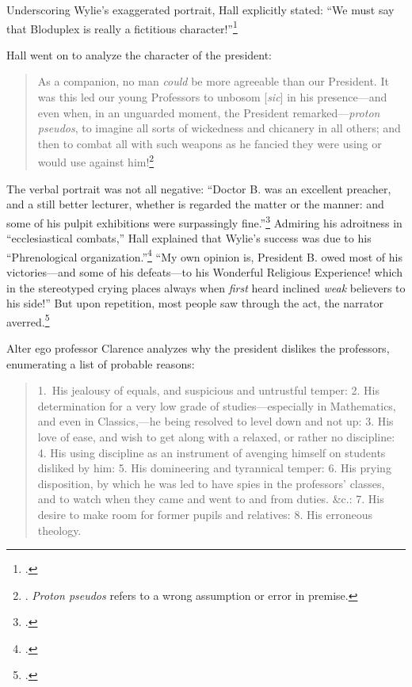 \documentclass[
  american,
  letterpaper,
]{scrreprt}
\begin{document}
Underscoring Wylie's exaggerated portrait, Hall explicitly stated: ``We
must say that Bloduplex is really a fictitious character!''\footnote{.}

Hall went on to analyze the character of the president:

\begin{quote}
As a companion, no man \emph{could} be more agreeable than our
President. It was this led our young Professors to unbosom
{[}\emph{sic}{]} in his presence---and even when, in an unguarded
moment, the President remarked---\emph{proton pseudos}, to imagine all
sorts of wickedness and chicanery in all others; and then to combat all
with such weapons as he fancied they were using or would use against
him!\footnote{. \emph{Proton
  pseudos} refers to a wrong assumption or error in premise.}
\end{quote}

The verbal portrait was not all negative: ``Doctor B. was an excellent
preacher, and a still better lecturer, whether is regarded the matter or
the manner: and some of his pulpit exhibitions were surpassingly
fine.''\footnote{.} Admiring his
adroitness in ``ecclesiastical combats,'' Hall explained that Wylie's
success was due to his ``Phrenological organization.''\footnote{.} ``My own opinion is, President B. owed most of his
victories---and some of his defeats---to his Wonderful Religious
Experience! which in the stereotyped crying places always when
\emph{first} heard inclined \emph{weak} believers to his side!'' But
upon repetition, most people saw through the act, the narrator
averred.\footnote{.}

Alter ego professor Clarence analyzes why the president dislikes the
professors, enumerating a list of probable reasons:

\begin{quote}
1.~His jealousy of equals, and suspicious and untrustful temper: 2. His
determination for a very low grade of studies---especially in
Mathematics, and even in Classics,---he being resolved to level down and
not up: 3. His love of ease, and wish to get along with a relaxed, or
rather no discipline: 4. His using discipline as an instrument of
avenging himself on students disliked by him: 5. His domineering and
tyrannical temper: 6. His prying disposition, by which he was led to
have spies in the professors' classes, and to watch when they came and
went to and from duties. \&c.: 7. His desire to make room for former
pupils and relatives: 8. His erroneous theology.
\end{quote}
\end{document}
